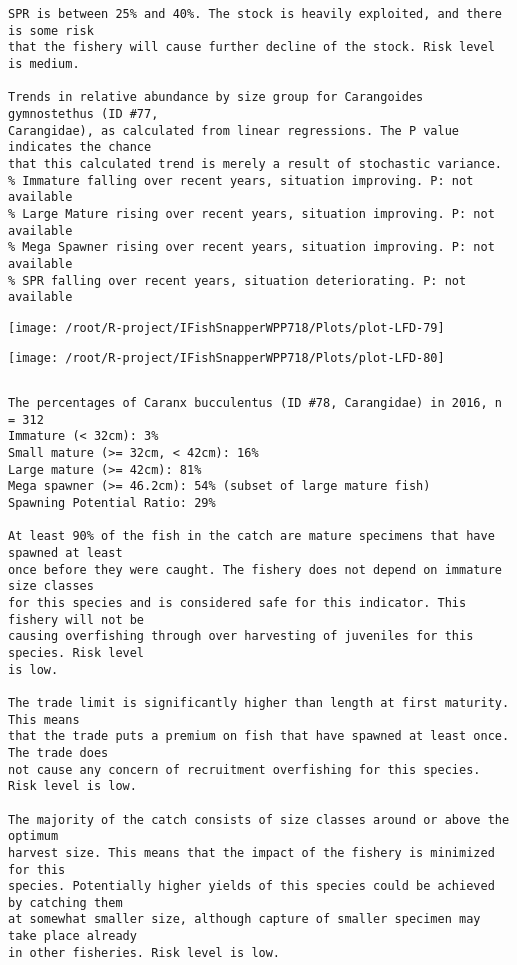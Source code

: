 \documentclass{report}\usepackage[]{graphicx}\usepackage[]{color}
\makeatletter
\def\maxwidth{ %
  \ifdim\Gin@nat@width>\linewidth
    \linewidth
  \else
    \Gin@nat@width
  \fi
}
\newenvironment{kframe}{%
 \def\at@end@of@kframe{}%
 \ifinner\ifhmode%
  \def\at@end@of@kframe{\end{minipage}}%
  \begin{minipage}{\columnwidth}%
 \fi\fi%
 \def\FrameCommand##1{\hskip\@totalleftmargin \hskip-\fboxsep
 \colorbox{shadecolor}{##1}\hskip-\fboxsep
     \hskip-\linewidth \hskip-\@totalleftmargin \hskip\columnwidth}%
 \MakeFramed {\advance\hsize-\width
   \@totalleftmargin\z@ \linewidth\hsize
   \@setminipage}}%
 {\par\unskip\endMakeFramed%
 \at@end@of@kframe}
\newenvironment{knitrout}{}{} %
\makeatother
\begin{document}
\begin{knitrout}
\begin{kframe}
\begin{verbatim}
SPR is between 25% and 40%. The stock is heavily exploited, and there is some risk
that the fishery will cause further decline of the stock. Risk level is medium.
 
Trends in relative abundance by size group for Carangoides gymnostethus (ID #77,
Carangidae), as calculated from linear regressions. The P value indicates the chance
that this calculated trend is merely a result of stochastic variance.
% Immature falling over recent years, situation improving. P: not available
% Large Mature rising over recent years, situation improving. P: not available
% Mega Spawner rising over recent years, situation improving. P: not available
% SPR falling over recent years, situation deteriorating. P: not available
\end{verbatim}
\end{kframe}
\texttt{[image: /root/R-project/IFishSnapperWPP718/Plots/plot-LFD-79]} 

\texttt{[image: /root/R-project/IFishSnapperWPP718/Plots/plot-LFD-80]} 
\begin{kframe}\begin{verbatim}
\end{verbatim}
\end{kframe}
\clearpage
\newpage
\begin{kframe}\begin{verbatim}The percentages of Caranx bucculentus (ID #78, Carangidae) in 2016, n = 312
Immature (< 32cm): 3%
Small mature (>= 32cm, < 42cm): 16%
Large mature (>= 42cm): 81%
Mega spawner (>= 46.2cm): 54% (subset of large mature fish)
Spawning Potential Ratio: 29%
 
At least 90% of the fish in the catch are mature specimens that have spawned at least
once before they were caught. The fishery does not depend on immature size classes
for this species and is considered safe for this indicator. This fishery will not be
causing overfishing through over harvesting of juveniles for this species. Risk level
is low.

The trade limit is significantly higher than length at first maturity.  This means
that the trade puts a premium on fish that have spawned at least once. The trade does
not cause any concern of recruitment overfishing for this species. Risk level is low.

The majority of the catch consists of size classes around or above the optimum
harvest size. This means that the impact of the fishery is minimized for this
species. Potentially higher yields of this species could be achieved by catching them
at somewhat smaller size, although capture of smaller specimen may take place already
in other fisheries. Risk level is low.


\end{verbatim}
\end{kframe}
\end{knitrout}
\end{document}
